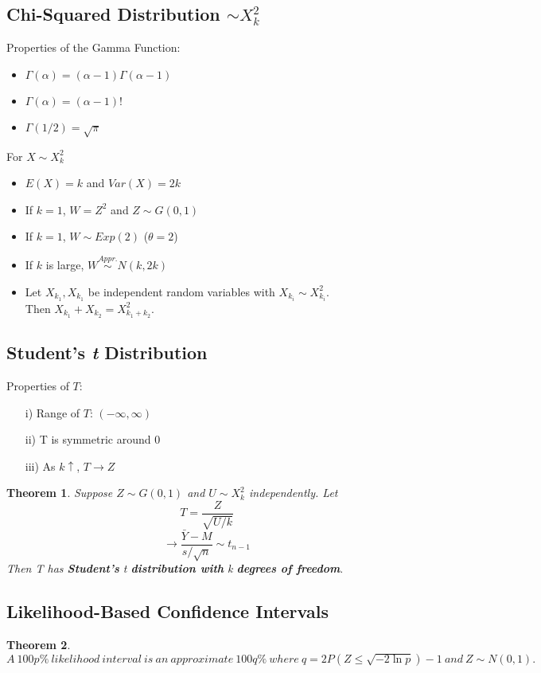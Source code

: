\documentclass[12pt, leqno]{article}
\theoremstyle{definition}
\newtheorem*{theorem}{Theorem}
\begin{document}
  \subsection{Chi-Squared Distribution $\sim X_{k}^{2}$}
  Properties of the Gamma Function:
  \begin{itemize}
    \item $\Gamma(\alpha) = (\alpha - 1)\Gamma(\alpha - 1)$
    \item $\Gamma(\alpha) = (\alpha - 1)!$
    \item $\Gamma(1/2) = \sqrt{\pi}$
  \end{itemize}
  For $X \sim X_{k}^{2}$
  \begin{itemize}
    \item $E(X) = k$ and $Var(X) = 2k$
    \item If $k = 1$, $W = Z^{2}$ and $Z \sim G(0,1)$
    \item If $k = 1$, $W \sim Exp(2)$ ($\theta = 2$)
    \item If $k$ is large, $W \stackrel{Appr.}{\sim} N(k, 2k)$
    \item Let $X_{k_{1}}, X_{k_{1}}$ be independent random variables with $X_{k_{i}} \sim X_{k_{i}}^{2}$. \\
    Then $X_{k_{1}} + X_{k_{2}} =  X_{k_{1} + k_{2}}^{2}$.
  \end{itemize}

  \subsection{Student's \emph{t} Distribution}
  Properties of $T$:
  \begin{itemize}
    \item[i)] Range of $T$: $(-\infty, \infty)$
    \item[ii)] T is symmetric around 0
    \item[iii)] As $k \uparrow$, $T \rightarrow Z$
  \end{itemize}

  \begin{theorem}
    \emph{Suppose $Z \sim G(0,1)$ and $U \sim X_{k}^{2}$ independently. Let}
    $$T = \frac{Z}{\sqrt{U / k}}$$
    $$\rightarrow \frac{\bar{Y} - M}{s / \sqrt{n}} \sim t_{n-1}$$
    \emph{Then T has \textbf{Student's} t \textbf{distribution with} k \bf{degrees of freedom}}.
  \end{theorem}

  \subsection{Likelihood-Based Confidence Intervals}
  \begin{theorem}
    $A~100p\%~likelihood~interval~is~an~approximate~100q\%~where~q = 2P(Z \leq \sqrt{-2\ln p}) - 1~and~Z \sim N(0,1).$
  \end{theorem}
\end{document}

